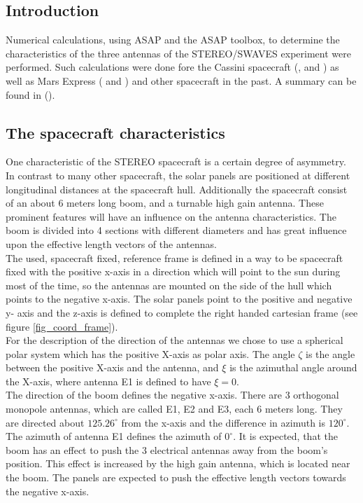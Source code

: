 \documentclass[galley,ras]{agu2001}
\begin{document}
\begin{article}
\subsection{Introduction}
Numerical calculations, using ASAP and the ASAP toolbox, to determine the characteristics of the three antennas of the STEREO/SWAVES experiment were performed. Such calculations were done fore the Cassini spacecraft (\cite{cassini}, \cite{cassini2} and \cite{vogl_01}) as well as Mars Express (\cite{marsis} and \cite{marsis2}) and other spacecraft in the past. A summary can be found in (\cite{ruckerundi05}).\\

\subsection{The spacecraft characteristics}

One characteristic of the STEREO spacecraft is a certain degree of asymmetry. In contrast to many other spacecraft, the solar panels are positioned at different longitudinal distances at the spacecraft hull. Additionally the spacecraft consist of an about 6 meters long boom, and a turnable high gain antenna. These prominent features will have an influence on the antenna characteristics. The boom is divided into 4 sections with different diameters and has great influence upon the effective length vectors of the antennas.\\

The used, spacecraft fixed, reference frame is defined in a way to be spacecraft fixed with the positive x-axis in a direction which will point to the sun during most of the time, so the antennas are mounted on the side of the hull which points to the negative x-axis. The solar panels point to the positive and negative y- axis and the z-axis is defined to complete the right handed cartesian frame (see figure \ref{fig_coord_frame}).\\

For the description of the direction of the antennas we chose to use a spherical polar system which has the positive X-axis as polar axis. The angle $\zeta$ is the angle between the positive X-axis and the antenna, and $\xi$ is the azimuthal angle around the X-axis, where antenna E1 is defined to have $\xi=0$.\\

The direction of the boom defines the negative x-axis. There are 3 orthogonal monopole antennas, which are called E1, E2 and E3, each 6 meters long. They are directed about $125.26^\circ$ from the x-axis and the difference in azimuth is $120^\circ$. The azimuth of antenna E1 defines the azimuth of $0^\circ$. It is expected, that the boom has an effect to push the 3 electrical antennas away from the boom's position. This effect is increased by the high gain antenna, which is located near the boom. The panels are expected to push the effective length vectors towards the negative x-axis. \\


\end{article}
\end{document}
